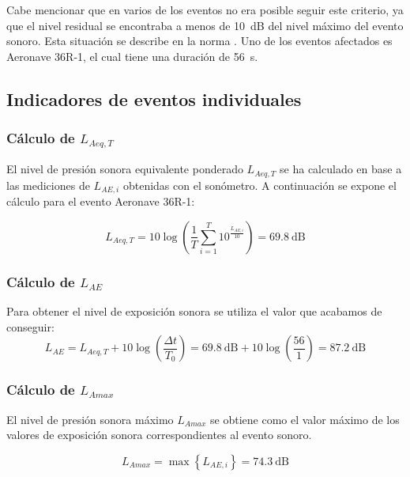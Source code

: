 \documentclass[11pt]{article}
\begin{document}
Cabe mencionar que en varios de los eventos no era posible seguir este criterio, ya que el nivel residual se encontraba a menos de \qty{10}{\dB} del nivel máximo del evento sonoro. Esta situación se describe en la norma \cite{ISO20906:2009}. Uno de los eventos afectados es Aeronave 36R-1, el cual tiene una duración de \qty{56}{\s}.

\subsection{Indicadores de eventos individuales}

\subsubsection{Cálculo de $L_{Aeq,T}$}

El nivel de presión sonora equivalente ponderado $L_{Aeq,T}$ se ha calculado en base a las mediciones de $L_{AE, i}$ obtenidas con el sonómetro. A continuación se expone el cálculo para el evento Aeronave 36R-1:

\begin{equation} \label{eq:laeqt}
    L_{Aeq,T} = 10 \log \left( \frac{1}{T} \sum_{i=1}^{T} 10^{\frac{L_{AE, i}}{10}} \right) = \qty{69.8}{\dB}
\end{equation}

\subsubsection{Cálculo de $L_{AE}$}

Para obtener el nivel de exposición sonora se utiliza el valor que acabamos de conseguir:
\begin{equation} \label{eq:laeq}
    L_{AE} = L_{Aeq,T} + 10 \log \left( \frac{\Delta t}{T_0} \right) = \qty{69.8}{\dB} + 10 \log \left( \frac{56}{1} \right) = \qty{87.2}{\dB}
\end{equation}

\subsubsection{Cálculo de $L_{Amax}$}

El nivel de presión sonora máximo $L_{Amax}$ se obtiene como el valor máximo de los valores de exposición sonora correspondientes al evento sonoro.

\begin{equation}
    L_{Amax} = \max \left\lbrace L_{AE, i} \right\rbrace = \qty{74.3}{\dB}
\end{equation}
\end{document}
